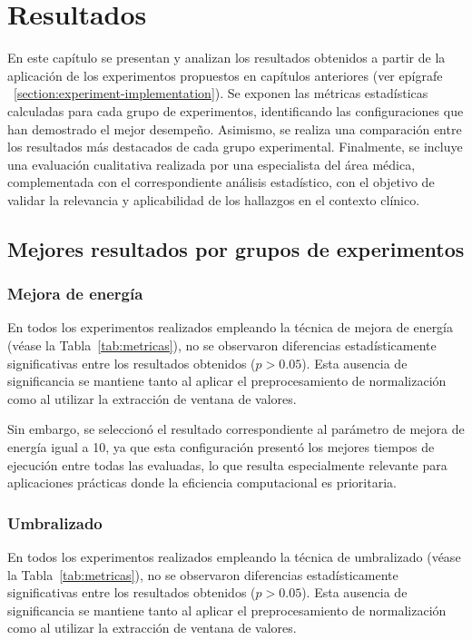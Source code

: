 \chapter{Resultados}\label{chapter:results}

En este capítulo se presentan y analizan los resultados obtenidos a partir de la aplicación de los experimentos propuestos en capítulos anteriores (ver epígrafe ~\ref{section:experiment-implementation}). Se exponen las métricas estadísticas calculadas para cada grupo de experimentos, identificando las configuraciones que han demostrado el mejor desempeño. Asimismo, se realiza una comparación entre los resultados más destacados de cada grupo experimental. Finalmente, se incluye una evaluación cualitativa realizada por una especialista del área médica, complementada con el correspondiente análisis estadístico, con el objetivo de validar la relevancia y aplicabilidad de los hallazgos en el contexto clínico.

\section{Mejores resultados por grupos de experimentos}

\subsection{Mejora de energía}

En todos los experimentos realizados empleando la técnica de mejora de energía (véase la Tabla~\ref{tab:metricas}), no se observaron diferencias estadísticamente significativas entre los resultados obtenidos ($p > 0.05$). Esta ausencia de significancia se mantiene tanto al aplicar el preprocesamiento de normalización como al utilizar la extracción de ventana de valores. 

Sin embargo, se seleccionó el resultado correspondiente al parámetro de mejora de energía igual a 10, ya que esta configuración presentó los mejores tiempos de ejecución entre todas las evaluadas, lo que resulta especialmente relevante para aplicaciones prácticas donde la eficiencia computacional es prioritaria.

\subsection{Umbralizado}

En todos los experimentos realizados empleando la técnica de umbralizado (véase la Tabla~\ref{tab:metricas}), no se observaron diferencias estadísticamente significativas entre los resultados obtenidos ($p > 0.05$). Esta ausencia de significancia se mantiene tanto al aplicar el preprocesamiento de normalización como al utilizar la extracción de ventana de valores.

